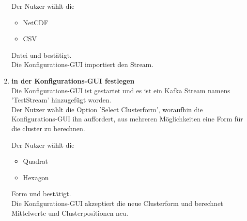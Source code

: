 \begin{enumerate}[label=\textbf{TI\arabic{enumi}0}]
		Der Nutzer wählt die
		\begin{itemize}
		\item NetCDF
		\item CSV
		\end{itemize}
		Datei und bestätigt.\\
		Die Konfigurations-GUI importiert den Stream.
	\item \textbf{ in der Konfigurations-GUI festlegen}\\
		Die Konfigurations-GUI ist gestartet und es ist ein Kafka Stream namens 'TestStream' hinzugefügt worden.\\
		Der Nutzer wählt die Option 'Select Clusterform', woraufhin die Konfigurations-GUI ihn auffordert, aus mehreren Möglichkeiten eine Form für die \gls{cluster} zu berechnen.\par
		
		Der Nutzer wählt die
		\begin{itemize}
		\item Quadrat
		\item Hexagon
		\end{itemize}
		Form und bestätigt.\\
		Die Konfigurations-GUI akzeptiert die neue Clusterform und berechnet Mittelwerte und Clusterpositionen neu.

\end{enumerate}

